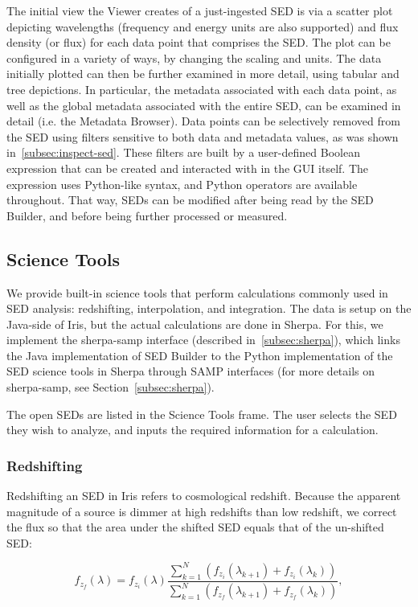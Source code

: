 \documentclass[5p]{elsarticle}
\begin{document}
The initial view the Viewer creates of a just-ingested SED is via a scatter plot depicting wavelengths (frequency and energy units are also supported) and flux density (or flux) for each data point that comprises the SED. The plot can be configured in a variety of ways, by changing the scaling and units. The data initially plotted can then be further examined in more detail, using tabular and tree depictions. In particular, the metadata associated with each data point, as well as the global metadata associated with the entire SED, can be examined in detail (i.e. the Metadata Browser). Data points can be selectively removed from the SED using filters sensitive to both data and metadata values, as was shown in~\ref{subsec:inspect-sed}. These filters are built by a user-defined Boolean expression that can be created and interacted with in the GUI itself. The expression uses Python-like syntax, and Python operators are available throughout. That way, SEDs can be modified after being read by the SED Builder, and before being further processed or measured.

\subsection{Science Tools}
We provide built-in science tools that perform calculations commonly used in SED analysis: redshifting, interpolation, and integration. The data is setup on the Java-side of Iris, but the actual calculations are done in Sherpa. For this, we implement the sherpa-samp interface (described in~\ref{subsec:sherpa}), which links the Java implementation of SED Builder to the Python implementation of the SED science tools in Sherpa through SAMP interfaces (for more details on sherpa-samp, see Section~\ref{subsec:sherpa}).

The open SEDs are listed in the Science Tools frame. The user selects the SED they wish to analyze, and inputs the required information for a calculation.

\subsubsection{Redshifting}
Redshifting an SED in Iris refers to cosmological redshift. Because the apparent magnitude of a source is dimmer at high redshifts than low redshift, we correct the flux so that the area under the shifted SED equals that of the un-shifted SED:

\begin{equation} \label{eq:redshift}
f_{z_{f}}(\lambda) = f_{z_{i}}(\lambda) \frac{\sum_{k=1}^N (f_{z_{i}}(\lambda_{k+1})+f_{z_{i}}(\lambda_{k}))}{\sum_{k=1}^N (f_{z_{f}}(\lambda_{k+1})+f_{z_{f}}(\lambda_{k}))},
\end{equation}
\end{document}
